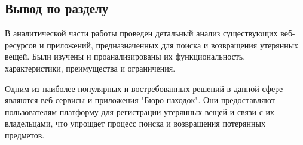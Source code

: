 \subsection*{Вывод по разделу}

В аналитической части работы проведен детальный анализ существующих веб-ресурсов и приложений, предназначенных для поиска и возвращения утерянных вещей. Были изучены и проанализированы их функциональность, характеристики, преимущества и ограничения.

Одним из наиболее популярных и востребованных решений в данной сфере являются веб-сервисы и приложения "Бюро находок". Они предоставляют пользователям платформу для регистрации утерянных вещей и связи с их владельцами, что упрощает процесс поиска и возвращения потерянных предметов.
